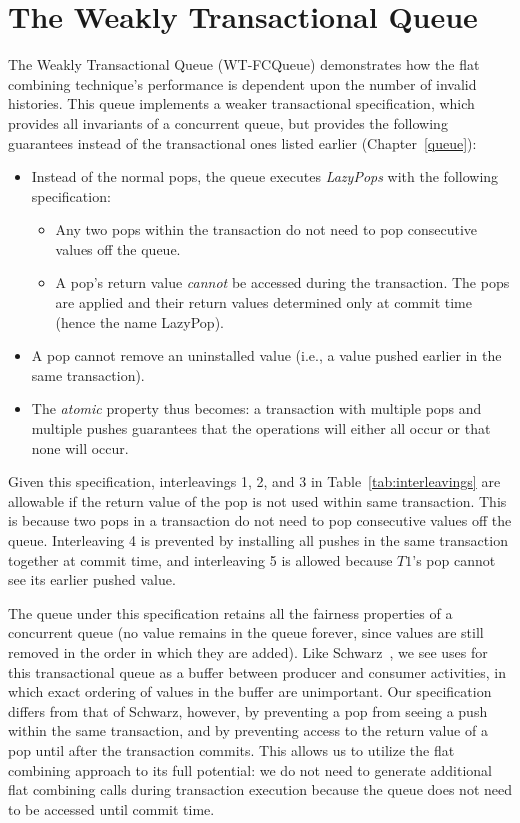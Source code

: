 \section{The Weakly Transactional Queue} 

The Weakly Transactional Queue (WT-FCQueue) demonstrates how the flat combining technique's performance is dependent upon the number of invalid histories. This queue implements a weaker transactional specification, which provides all invariants of a concurrent queue, but provides the following guarantees instead of the transactional ones listed earlier (Chapter~\ref{queue}):
\begin{itemize}
    \item Instead of the normal pops, the queue executes \emph{LazyPops} with the following specification:
        \begin{itemize}
            \item Any two pops within the transaction do not need to pop consecutive values off the queue.
            \item A pop's return value \emph{cannot} be accessed during the transaction. The pops are applied and their return values determined only at commit time (hence the name LazyPop). 
        \end{itemize}
    \item A pop cannot remove an uninstalled value (i.e., a value pushed earlier in the same transaction).
    \item The \emph{atomic} property thus becomes: a transaction with multiple pops and multiple pushes guarantees that the operations will either all occur or that none will occur.
\end{itemize}

Given this specification, interleavings 1, 2, and 3 in Table~\ref{tab:interleavings} are allowable if the return value of the pop is not used within same transaction. This is because two pops in a transaction do not need to pop consecutive values off the queue. Interleaving 4 is prevented by installing all pushes in the same transaction together at commit time, and interleaving 5 is allowed because $T1$'s pop cannot see its earlier pushed value.

The queue under this specification retains all the fairness properties of a concurrent queue (no value remains in the queue forever, since values are still removed in the order in which they are added). Like Schwarz~\cite{schwarz}, we see uses for this transactional queue as a buffer between producer and consumer activities, in which exact ordering of values in the buffer are unimportant.
Our specification differs from that of Schwarz, however, by preventing a pop from seeing a push within the same transaction, and by preventing access to the return value of a pop until after the transaction commits. This allows us to utilize the flat combining approach to its full potential: we do not need to generate additional flat combining calls during transaction execution because the queue does not need to be accessed until commit time.

